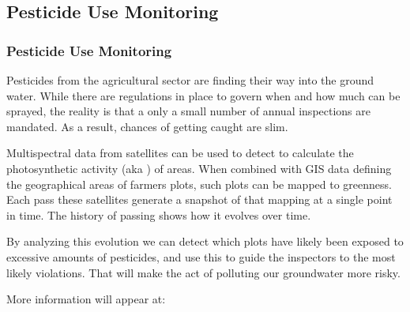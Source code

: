 \subsection{Pesticide Use Monitoring}
\begin{frame}
    \frametitle{Pesticide Use Monitoring}
    Pesticides from the agricultural sector are finding their way into the ground water. While there are regulations in place to govern when and how much can be sprayed, the reality is that a only a small number of annual inspections are mandated. As a result, chances of getting caught are slim.
    \vspace{2mm}
    
    Multispectral data from satellites can be used to detect to calculate the photosynthetic activity (aka ) of areas. When combined with GIS data defining the geographical areas of farmers plots, such plots can be mapped to greenness. Each pass these satellites generate a snapshot of that mapping at a single point in time. The history of passing shows how it evolves over time.
    \vspace{2mm}
    
    By analyzing this evolution we can detect which plots have likely been exposed to excessive amounts of pesticides, and use this to guide the inspectors to the most likely violations. That will make the act of polluting our groundwater more risky.
    \vspace{2mm}
    
    More information will appear at: 
\end{frame}

